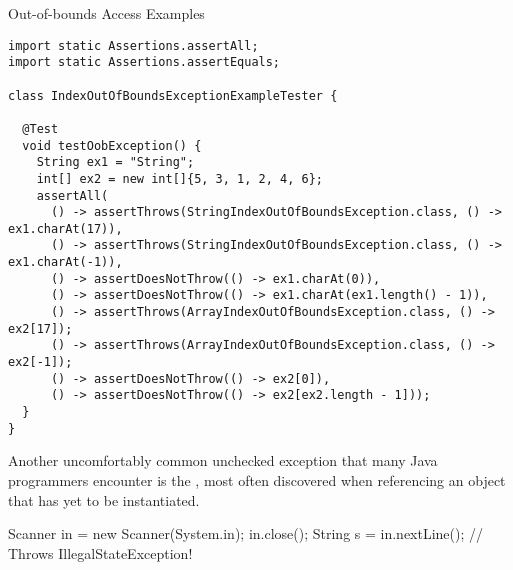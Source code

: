 \begin{cl}[]{Out-of-bounds Access Examples}
\begin{lstlisting}[language=MyJava]
import static Assertions.assertAll;
import static Assertions.assertEquals;

class IndexOutOfBoundsExceptionExampleTester {

  @Test
  void testOobException() {
    String ex1 = "String";
    int[] ex2 = new int[]{5, 3, 1, 2, 4, 6}; 
    assertAll(
      () -> assertThrows(StringIndexOutOfBoundsException.class, () -> ex1.charAt(17)),
      () -> assertThrows(StringIndexOutOfBoundsException.class, () -> ex1.charAt(-1)),
      () -> assertDoesNotThrow(() -> ex1.charAt(0)),
      () -> assertDoesNotThrow(() -> ex1.charAt(ex1.length() - 1)),
      () -> assertThrows(ArrayIndexOutOfBoundsException.class, () -> ex2[17]);
      () -> assertThrows(ArrayIndexOutOfBoundsException.class, () -> ex2[-1]);
      () -> assertDoesNotThrow(() -> ex2[0]),
      () -> assertDoesNotThrow(() -> ex2[ex2.length - 1]));
  } 
}
\end{lstlisting}
\end{cl} 

Another uncomfortably common unchecked exception that many Java programmers encounter is the , most often discovered when referencing an object that has yet to be instantiated. 


\begin{verbnobox}[\small]
Scanner in = new Scanner(System.in);
in.close();
String s = in.nextLine(); // Throws IllegalStateException!
\end{verbnobox}
